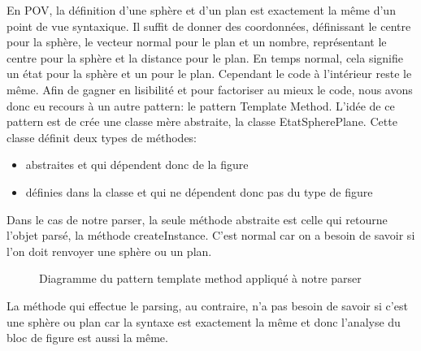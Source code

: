 \documentclass[../../Rapport RayTracer]{subfiles}
\begin{document}
En POV, la définition d'une sphère et d'un plan est exactement la même d'un point de vue syntaxique. Il suffit de donner des coordonnées, définissant le centre pour la sphère, le vecteur normal pour le plan et un nombre, représentant le centre pour la sphère et la distance pour le plan. En temps normal, cela signifie un état pour la sphère et un pour le plan. Cependant le code à l'intérieur reste le même.
Afin de gagner en lisibilité et pour factoriser au mieux le code, nous avons donc eu recours à un autre pattern: le pattern Template Method. L'idée de ce pattern est de crée une classe mère abstraite, la classe EtatSpherePlane. Cette classe définit deux types de méthodes:

\begin{itemize}
\item abstraites et qui dépendent donc de la figure
\item définies dans la classe et qui ne dépendent donc pas du type de figure
\end{itemize}

Dans le cas de notre parser, la seule méthode abstraite est celle qui retourne l'objet parsé, la méthode createInstance. C'est normal car on a besoin de savoir si l'on doit renvoyer une sphère ou un plan.

\begin{figure}[h!]
	
	\caption{Diagramme du pattern template method appliqué à notre parser}
	\label{diagrammePatternTemplateMethod}
\end{figure}
\FloatBarrier

La méthode qui effectue le parsing, au contraire,  n'a pas besoin de savoir si c'est une sphère ou plan car la syntaxe est exactement la même et donc l'analyse du bloc de figure est aussi la même.
\end{document}
